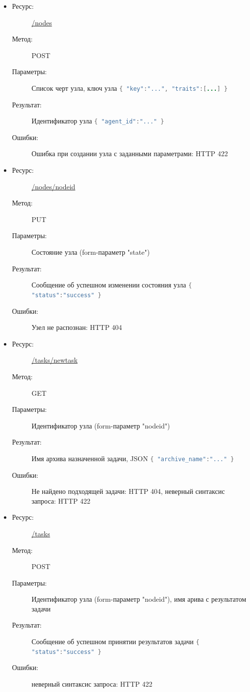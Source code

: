 \documentclass[a4paper,12pt]{report}
\numberwithin{equation}{section}
\begin{document}
  \begin{itemize}
    \item
    \begin{description}
      \item[Ресурс:] \url{/nodes}
      \item[Метод:] POST
      \item[Параметры:] Список черт узла, ключ узла
      \lstinline[language=Java]|{ "key":"...", "traits":[...] }|
      \item[Результат:] Идентификатор узла
      \lstinline[language=Java]|{ "agent_id":"..." }|
      \item[Ошибки:] Ошибка при создании узла с заданными параметрами: HTTP 422
    \end{description}
    \item
    \begin{description}
      \item[Ресурс:] \url{/nodes/nodeid}
      \item[Метод:] PUT
      \item[Параметры:] Состояние узла (form-параметр "state")
      \item[Результат:] Сообщение об успешном изменении состояния узла
      \lstinline[language=Java]|{ "status":"success" }|
      \item[Ошибки:] Узел не распознан: HTTP 404
    \end{description}
    \item
    \begin{description}
      \item[Ресурс:] \url{/tasks/newtask}
      \item[Метод:] GET
      \item[Параметры:] Идентификатор узла (form-параметр "nodeid")
      \item[Результат:] Имя архива назначенной задачи, JSON
      \lstinline[language=Java]|{ "archive_name":"..." }|
      \item[Ошибки:] Не найдено подходящей задачи: HTTP 404, неверный синтаксис запроса: HTTP 422
    \end{description}
    \item
    \begin{description}
      \item[Ресурс:] \url{/tasks}
      \item[Метод:] POST
      \item[Параметры:] Идентификатор узла (form-параметр "nodeid"), имя арива с результатом задачи
      \item[Результат:] Сообщение об успешном принятии результатов задачи
      \lstinline[language=Java]|{ "status":"success" }|
      \item[Ошибки:] неверный синтаксис запроса: HTTP 422
    \end{description}
  \end{itemize}
  
\end{document}
